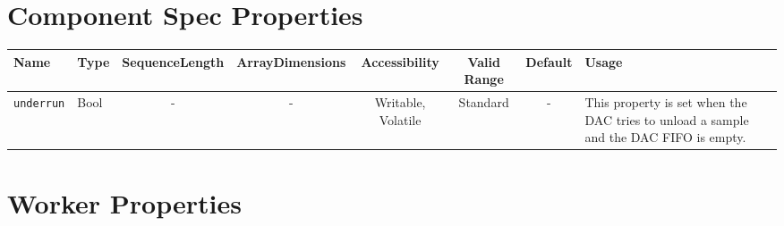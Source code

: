 \documentclass{article}
\begin{document}
\begin{landscape}
	\section*{Component Spec Properties}
	\begin{scriptsize}
		\begin{tabular}{|p{3cm}|p{1.5cm}|c|c|c|c|c|p{7cm}|}
			\hline
			\rowcolor{blue}
			Name            & Type & SequenceLength & ArrayDimensions & Accessibility      & Valid Range & Default & Usage                                                                                 \\
			\hline
			\verb+underrun+ & Bool & -              & -               & Writable, Volatile & Standard    & -       & This property is set when the DAC tries to unload a sample and the DAC FIFO is empty. \\
			\hline
		\end{tabular}
	\end{scriptsize}

	\section*{Worker Properties}

\end{landscape}
\end{document}
